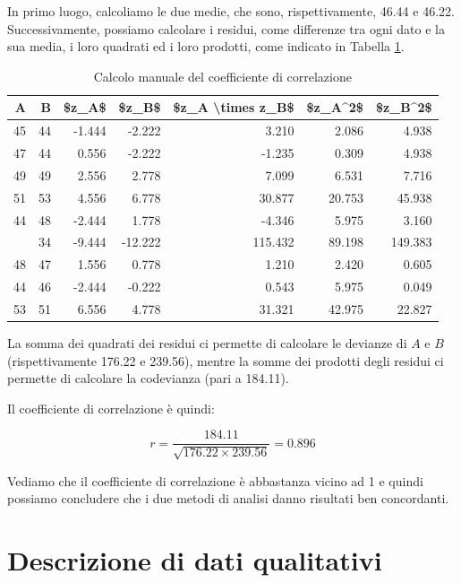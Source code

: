 \documentclass[a4paper,12pt,oneside]{book}
\begin{document}
In primo luogo, calcoliamo le due medie, che sono, rispettivamente, 46.44 e 46.22. Successivamente, possiamo calcolare i residui, come differenze tra ogni dato e la sua media, i loro quadrati ed i loro prodotti, come indicato in Tabella \ref{tab:tabName3}.

\begin{table}

\caption{\label{tab:tabName3}Calcolo manuale del coefficiente di correlazione}
\centering
\begin{tabular}[t]{rrrrrrr}
\toprule
A & B & \$z\_A\$ & \$z\_B\$ & \$z\_A \textbackslash{}times z\_B\$ & \$z\_A\textasciicircum{}2\$ & \$z\_B\textasciicircum{}2\$\\
\midrule
45 & 44 & -1.444 & -2.222 & 3.210 & 2.086 & 4.938\\
47 & 44 & 0.556 & -2.222 & -1.235 & 0.309 & 4.938\\
49 & 49 & 2.556 & 2.778 & 7.099 & 6.531 & 7.716\\
51 & 53 & 4.556 & 6.778 & 30.877 & 20.753 & 45.938\\
44 & 48 & -2.444 & 1.778 & -4.346 & 5.975 & 3.160\\
\addlinespace
37 & 34 & -9.444 & -12.222 & 115.432 & 89.198 & 149.383\\
48 & 47 & 1.556 & 0.778 & 1.210 & 2.420 & 0.605\\
44 & 46 & -2.444 & -0.222 & 0.543 & 5.975 & 0.049\\
53 & 51 & 6.556 & 4.778 & 31.321 & 42.975 & 22.827\\
\bottomrule
\end{tabular}
\end{table}

La somma dei quadrati dei residui ci permette di calcolare le devianze di \(A\) e \(B\) (rispettivamente 176.22 e 239.56), mentre la somme dei prodotti degli residui ci permette di calcolare la codevianza (pari a 184.11).

Il coefficiente di correlazione è quindi:

\[r = \frac{184.11}{\sqrt{176.22 \times 239.56}} = 0.896\]

Vediamo che il coefficiente di correlazione è abbastanza vicino ad 1 e quindi possiamo concludere che i due metodi di analisi danno risultati ben concordanti.

\hypertarget{descrizione-di-dati-qualitativi}{%
\section{Descrizione di dati qualitativi}\label{descrizione-di-dati-qualitativi}}
\end{document}
